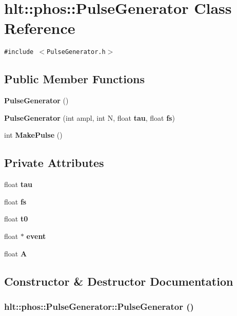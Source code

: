\section{hlt::phos::Pulse\-Generator Class Reference}
\label{classhlt_1_1phos_1_1PulseGenerator}
{\tt \#include $<$Pulse\-Generator.h$>$}

\subsection*{Public Member Functions}
\begin{CompactItemize}
\item 
{\bf Pulse\-Generator} ()
\item 
{\bf Pulse\-Generator} (int ampl, int N, float {\bf tau}, float {\bf fs})
\item 
int {\bf Make\-Pulse} ()
\end{CompactItemize}
\subsection*{Private Attributes}
\begin{CompactItemize}
\item 
float {\bf tau}
\item 
float {\bf fs}
\item 
float {\bf t0}
\item 
float $\ast$ {\bf event}
\item 
float {\bf A}
\end{CompactItemize}


\subsection{Constructor \& Destructor Documentation}
\subsubsection{\setlength{\rightskip}{0pt plus 5cm}hlt::phos::Pulse\-Generator::Pulse\-Generator ()}\label{classhlt_1_1phos_1_1PulseGenerator_a0}


